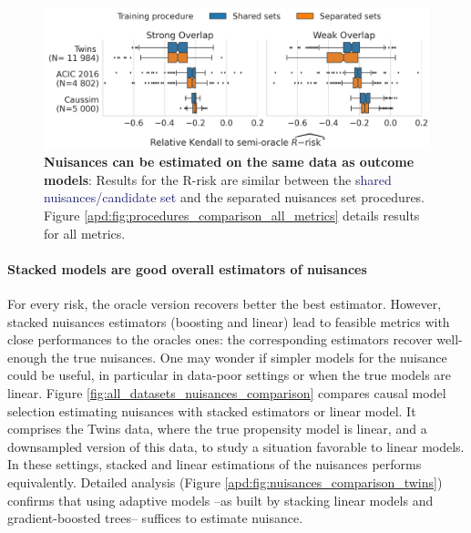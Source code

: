 \documentclass{report}
\begin{document}
\begin{figure}[!tb]
  \centering
  \includegraphics[width=0.8\linewidth]{img/chapter_5/_3_procedure_r_risk_only_3datasets.png}
  \caption{\textbf{Nuisances can be estimated on the same data as outcome
      models}: Results for the R-risk are similar between the
    \textcolor{MidnightBlue}{shared
      nuisances/candidate set} and
    the \textcolor{RedOrange}{separated nuisances set} procedures. Figure
    \ref{apd:fig:procedures_comparison_all_metrics} details results for all metrics.}\label{fig:procedures_comparison}
\end{figure}


\paragraph{Stacked models are good overall estimators of nuisances}

For every risk, the oracle version recovers better the best estimator.
However,
stacked nuisances estimators (boosting and linear) lead to feasible
metrics with close performances to the oracles ones: the
corresponding estimators recover well-enough the true nuisances.
One may wonder if simpler models for the nuisance could be useful,
in particular in data-poor settings or when the true models are linear.
Figure \ref{fig:all_datasets_nuisances_comparison} compares causal model
selection estimating nuisances with stacked estimators or linear model.
It comprises the Twins data, where the true propensity model is linear,
and a downsampled version of this data, to study a situation favorable to
linear models. In these settings,
stacked and linear estimations of the nuisances performs equivalently.
Detailed analysis (Figure \ref{apd:fig:nuisances_comparison_twins})
confirms that using adaptive models --as built by
stacking linear models and gradient-boosted trees-- suffices to estimate nuisance.
\end{document}
